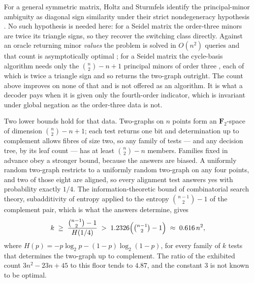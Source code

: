 \begin{remark}
\label{rem:alignment-query-count}
For a general symmetric matrix, Holtz and Sturmfels identify the
principal-minor ambiguity as diagonal sign similarity under their strict
nondegeneracy hypothesis \cite[Thm.~6]{HoltzSturmfels}.  No such hypothesis
is needed here: for a Seidel matrix the order-three minors are twice its
triangle signs, so they recover the switching class directly.  Against an
oracle
returning minor \emph{values} the problem is solved in \(O(n^2)\) queries and
that count is asymptotically optimal
\cite{RisingKuleszaTaskar,BrunelUrschel}; for a Seidel matrix the cycle-basis
algorithm needs only the \(\binom n2-n+1\) principal minors of order three
\cite{BrunelSignedDPP}, each of which is twice a triangle sign and so returns
the two-graph outright.  The count above improves on none of that and is not
offered as an algorithm.  It is what a decoder pays when it is given only the
fourth-order indicator, which is invariant under global negation as the
order-three data is not.

Two lower bounds hold for that data.  Two-graphs on \(n\) points form an
\(\mathbf F_2\)-space of dimension \(\binom n2-n+1\); each test returns one
bit and determination up to complement allows fibres of size two, so any
family of tests --- and any decision tree, by its leaf count --- has at least
\(\binom n2-n\) members.  Families fixed in advance obey a stronger bound,
because the answers are biased.  A uniformly random two-graph restricts to a
uniformly random two-graph on any four points, and two of those eight are
aligned, so every alignment test answers yes with probability exactly
\(1/4\).  The information-theoretic bound of combinatorial search theory,
subadditivity of entropy applied to the entropy \(\binom{n-1}{2}-1\) of the
complement pair, which is what the answers determine, gives
\[
 k\;\ge\;\frac{\binom{n-1}{2}-1}{H(1/4)}
 \;>\;1.2326\Bigl(\tbinom{n-1}{2}-1\Bigr)\;\approx\;0.616\,n^2,
\]
where \(H(p)=-p\log_2p-(1-p)\log_2(1-p)\), for every family of \(k\) tests
that determines the two-graph up to complement.  The ratio of the exhibited
count \(3n^2-23n+45\) to this floor tends to \(4.87\), and the constant
\(3\) is not known to be optimal.


\end{remark}
